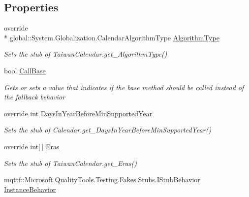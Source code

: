 \subsection*{Properties}
\begin{DoxyCompactItemize}
\item 
override \\*
global\-::\-System.\-Globalization.\-Calendar\-Algorithm\-Type \hyperlink{class_system_1_1_globalization_1_1_fakes_1_1_stub_taiwan_calendar_a2909bba7a768e86024c4211365fcffe0}{Algorithm\-Type}
\begin{DoxyCompactList}\small\item\em Sets the stub of Taiwan\-Calendar.\-get\-\_\-\-Algorithm\-Type()\end{DoxyCompactList}\item 
bool \hyperlink{class_system_1_1_globalization_1_1_fakes_1_1_stub_taiwan_calendar_a3f76a85e4ca813f1c7444a25f0159b82}{Call\-Base}
\begin{DoxyCompactList}\small\item\em Gets or sets a value that indicates if the base method should be called instead of the fallback behavior\end{DoxyCompactList}\item 
override int \hyperlink{class_system_1_1_globalization_1_1_fakes_1_1_stub_taiwan_calendar_ab58fd81186d69eecc64e99ed4a4dfa94}{Days\-In\-Year\-Before\-Min\-Supported\-Year}
\begin{DoxyCompactList}\small\item\em Sets the stub of Calendar.\-get\-\_\-\-Days\-In\-Year\-Before\-Min\-Supported\-Year()\end{DoxyCompactList}\item 
override int\mbox{[}$\,$\mbox{]} \hyperlink{class_system_1_1_globalization_1_1_fakes_1_1_stub_taiwan_calendar_a3e97426ddff95caec1e3694a7f686646}{Eras}
\begin{DoxyCompactList}\small\item\em Sets the stub of Taiwan\-Calendar.\-get\-\_\-\-Eras()\end{DoxyCompactList}\item 
mqttf\-::\-Microsoft.\-Quality\-Tools.\-Testing.\-Fakes.\-Stubs.\-I\-Stub\-Behavior \hyperlink{class_system_1_1_globalization_1_1_fakes_1_1_stub_taiwan_calendar_ace027efdacf5b08a459f7ba1d9cdc2ee}{Instance\-Behavior}

\end{DoxyCompactItemize}
